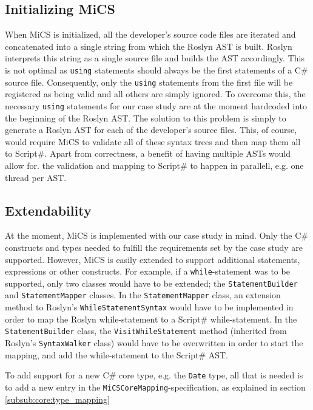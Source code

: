 
\subsection{Initializing MiCS} %
\label{ssub:collecting_source_code}
When MiCS is initialized, all the developer's source code files are iterated and concatenated into a single string from which the Roslyn AST is built. Roslyn interprets this string as a single source file and builds the AST accordingly. This is not optimal as \texttt{using} statements should always be the first statements of a C\# source file. Consequently, only the \texttt{using} statements from the first file will be registered as being valid and all others are simply ignored. To overcome this, the necessary \texttt{using} statements for our case study are at the moment hardcoded into the beginning of the Roslyn AST. The solution to this problem is simply to generate a Roslyn AST for each of the developer's source files. This, of course, would require MiCS to validate all of these syntax trees and then map them all to Script\#. Apart from correctness, a benefit of having multiple ASTs would allow for. the validation and mapping to Script\# to happen in parallell, e.g. one thread per AST.

\subsection{Extendability} %
\label{sub:extendability}
At the moment, MiCS is implemented with our case study in mind. Only the C\# constructs and types needed to fulfill the requirements set by the case study are supported. However, MiCS is easily extended to support additional statements, expressions or other constructs. For example, if a \texttt{while}-statement was to be supported, only two classes would have to be extended; the \texttt{StatementBuilder} and \texttt{StatementMapper} classes. In the \texttt{StatementMapper} class, an extension method to Roslyn's \texttt{WhileStatementSyntax} would have to be implemented in order to map the Roslyn while-statement to a Script\# while-statement. In the \texttt{StatementBuilder} class, the \texttt{VisitWhileStatement} method (inherited from Roslyn's \texttt{SyntaxWalker} class) would have to be overwritten in order to start the mapping, and add the while-statement to the Script\# AST.

To add support for a new C\# core type, e.g. the \texttt{Date} type, all that is needed is to add a new entry in the \texttt{MiCSCoreMapping}-specification, as explained in section \ref{subsub:core:type_mapping}

